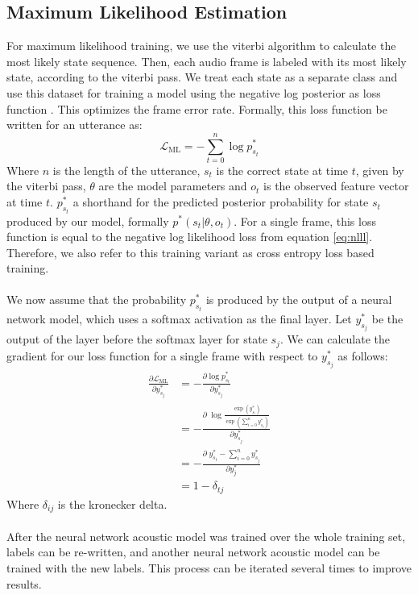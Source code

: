 \subsection{Maximum Likelihood Estimation}
For maximum likelihood training, we use the viterbi algorithm to calculate the most likely state sequence. Then, each audio frame is labeled with its most likely state, according to the viterbi pass. We treat each state as a separate class and use this dataset for training a model using the negative log posterior as loss function \cite{kitasr2018stueker}. This optimizes the frame error rate. Formally, this loss function be written for an utterance as:
\[
\mathcal{L}_{\text{ML}} = - \sum_{t = 0}^{n} \log p^*_{s_t}
\]
Where $n$ is the length of the utterance, $s_t$ is the correct state at time $t$, given by the viterbi pass, $\theta$ are the model parameters and $o_t$ is the observed feature vector at time $t$. $p^*_{s_t}$ a shorthand for the predicted posterior probability for state $s_t$ produced by our model, formally $p^*(s_t|\theta,o_t)$. For a single frame, this loss function is equal to the negative log likelihood loss from equation \ref{eq:nlll}. Therefore, we also refer to this training variant as cross entropy loss based training. \\ \\
We now assume that the probability $p^*_{s_t}$ is produced by the output of a neural network model, which uses a softmax activation as the final layer. Let $y^*_{s_j}$ be the output of the layer before the softmax layer for state $s_j$. We can calculate the gradient for our loss function for a single frame with respect to $y^*_{s_j}$ as follows:
\begin{align*}
\frac{\partial\mathcal{L}_\text{ML}}{\partial y^*_{s_j}} &= -\frac{\partial \log p^*_{s_t}}{\partial y^*_{s_j}} \\
&= -\frac{\partial \; \log \frac{\exp \left(y^*_{s_t}\right)}{\exp\left(\sum_{i = 0}^{n} y^*_{s_j}\right)}}{\partial y^*_{s_j}} \\
&= -\frac{\partial \; y^*_{s_t} - \sum_{i = 0}^{n} y^*_{s_j}}{\partial y^*_j} \\
&= 1 - \delta_{tj}
\end{align*}
Where $\delta_{ij}$ is the kronecker delta. \\ \\
After the neural network acoustic model was trained over the whole training set, labels can be re-written, and another neural network acoustic model can be trained with the new labels. This process can be iterated several times to improve results. 
